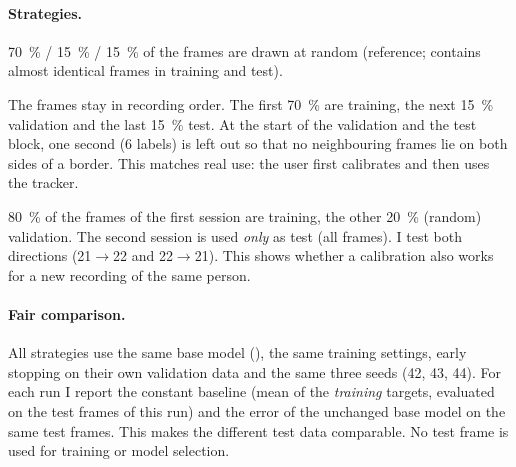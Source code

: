 \paragraph{Strategies.}
\begin{description}[nosep]
  \item[Random] \SI{70}{\percent} / \SI{15}{\percent} /
        \SI{15}{\percent} of the frames are drawn at random (reference; contains
        almost identical frames in training and test).
  \item[Sequential] The frames stay in recording
        order. The first \SI{70}{\percent} are training, the next
        \SI{15}{\percent} validation and the last \SI{15}{\percent} test. At the
        start of the validation and the test block, one second (6 labels) is
        left out so that no neighbouring frames lie on both sides of a border.
        This matches real use: the user first calibrates and then uses the
        tracker.
  \item[Two videos] \SI{80}{\percent} of the
        frames of the first session are training, the other \SI{20}{\percent}
        (random) validation. The second session is used \emph{only} as test (all
        frames). I test both directions (21$\to$22 and 22$\to$21). This shows
        whether a calibration also works for a new recording of the same
        person.
\end{description}

\paragraph{Fair comparison.} All strategies use the same base model
(), the same training settings, early stopping on their own
validation data and the same three seeds (42, 43, 44). For each run I report the
constant baseline (mean of the \emph{training} targets, evaluated on the test
frames of this run) and the error of the unchanged base model on the same test
frames. This makes the different test data comparable. No test frame is used for
training or model selection.

